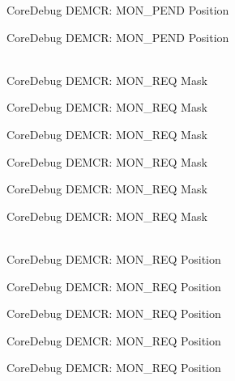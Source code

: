 \begin{DoxyRefList}
\label{deprecated__deprecated000502}%
%
Core\+Debug DEMCR:\+ MON\+\_\+\+PEND Position 

\label{deprecated__deprecated000604}%
%
Core\+Debug DEMCR:\+ MON\+\_\+\+PEND Position  
\item[{\parbox[t]{\linewidth}{Global \doxylink{group__CMSIS__CoreDebug_gae6384cbe8045051186d13ef9cdeace95}{Core\+Debug\+\_\+\+DEMCR\+\_\+\+MON\+\_\+\+REQ\+\_\+\+Msk} }}]\hfill \\
\label{deprecated__deprecated000048}%
%
Core\+Debug DEMCR:\+ MON\+\_\+\+REQ Mask 

\label{deprecated__deprecated000192}%
%
Core\+Debug DEMCR:\+ MON\+\_\+\+REQ Mask 

\label{deprecated__deprecated000334}%
%
Core\+Debug DEMCR:\+ MON\+\_\+\+REQ Mask 

\label{deprecated__deprecated000410}%
%
Core\+Debug DEMCR:\+ MON\+\_\+\+REQ Mask 

\label{deprecated__deprecated000499}%
%
Core\+Debug DEMCR:\+ MON\+\_\+\+REQ Mask 

\label{deprecated__deprecated000601}%
%
Core\+Debug DEMCR:\+ MON\+\_\+\+REQ Mask  
\item[{\parbox[t]{\linewidth}{Global \doxylink{group__CMSIS__CoreDebug_ga341020a3b7450416d72544eaf8e57a64}{Core\+Debug\+\_\+\+DEMCR\+\_\+\+MON\+\_\+\+REQ\+\_\+\+Pos} }}]\hfill \\
\label{deprecated__deprecated000047}%
%
Core\+Debug DEMCR:\+ MON\+\_\+\+REQ Position 

\label{deprecated__deprecated000191}%
%
Core\+Debug DEMCR:\+ MON\+\_\+\+REQ Position 

\label{deprecated__deprecated000333}%
%
Core\+Debug DEMCR:\+ MON\+\_\+\+REQ Position 

\label{deprecated__deprecated000409}%
%
Core\+Debug DEMCR:\+ MON\+\_\+\+REQ Position 

\label{deprecated__deprecated000498}%
%
Core\+Debug DEMCR:\+ MON\+\_\+\+REQ Position 


\end{DoxyRefList}
